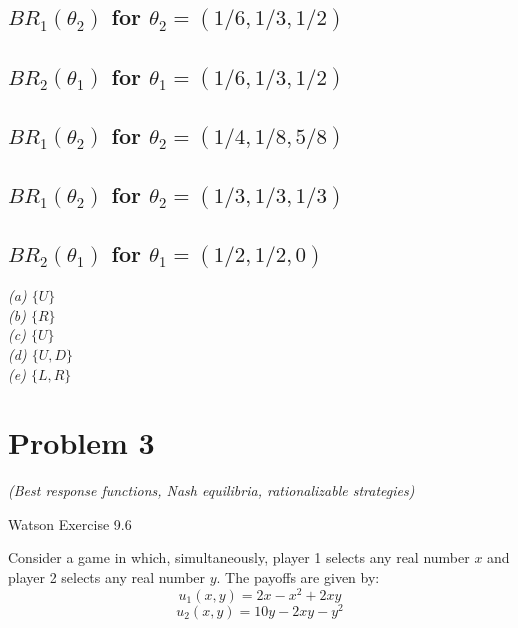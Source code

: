 \documentclass{article}
\begin{document}
\subsection{$BR_1(\theta_2)$ for $\theta_2 = (1/6,1/3,1/2)$}

\subsection{$BR_2(\theta_1)$ for $\theta_1 = (1/6,1/3,1/2)$}

\subsection{$BR_1(\theta_2)$ for $\theta_2 = (1/4,1/8,5/8)$}

\subsection{$BR_1(\theta_2)$ for $\theta_2 = (1/3,1/3,1/3)$}

\subsection{$BR_2(\theta_1)$ for $\theta_1 = (1/2,1/2,0)$}



\textit{\indent (a) $\{U\}$ \\ \indent (b) $\{R\}$ \\ \indent (c) $\{U\}$ \\ \indent (d) $\{U,D\}$ \\ \indent (e) $\{L,R\}$}

\bigskip

\section{Problem 3} \textit{(Best response functions, Nash equilibria, rationalizable strategies)}

Watson Exercise 9.6 

Consider a game in which, simultaneously, player 1 selects any real number
$x$ and player 2 selects any real number $y$. The payoffs are given by:
$$u_1(x,y)= 2x-x^2+2xy$$
$$u_2(x,y)= 10y-2xy -y^2$$

\end{document}
